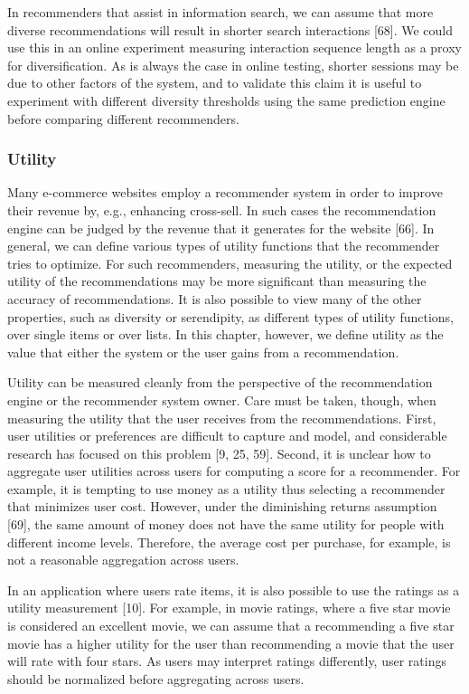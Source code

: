 In recommenders that assist in information search, we can assume that more diverse recommendations will result in shorter search interactions [68]. We could use this in an online experiment measuring interaction sequence length as a proxy for diversification. As is always the case in online testing, shorter sessions may be due to other factors of the system, and to validate this claim it is useful to experiment with different diversity thresholds using the same prediction engine before comparing different recommenders.

\subsubsection{Utility}

Many e-commerce websites employ a recommender system in order to improve their revenue by, e.g., enhancing cross-sell. In such cases the recommendation engine can be judged by the revenue that it generates for the website [66]. In general, we can define various types of utility functions that the recommender tries to optimize. For such recommenders, measuring the utility, or the expected utility of the recommendations may be more significant than measuring the accuracy of recommendations. It is also possible to view many of the other properties, such as diversity or serendipity, as different types of utility functions, over single items or over lists. In this chapter, however, we define utility as the value that either the system or the user gains from a recommendation.

Utility can be measured cleanly from the perspective of the recommendation engine or the recommender system owner. Care must be taken, though, when measuring the utility that the user receives from the recommendations. First, user utilities or preferences are difficult to capture and model, and considerable research has focused on this problem [9, 25, 59]. Second, it is unclear how to aggregate user utilities across users for computing a score for a recommender. For example, it is tempting to use money as a utility thus selecting a recommender that minimizes user cost. However, under the diminishing returns assumption [69], the same amount of money does not have the same utility for people with different income levels. Therefore, the average cost per purchase, for example, is not a reasonable aggregation across users.

In an application where users rate items, it is also possible to use the ratings as a utility measurement [10]. For example, in movie ratings, where a five star movie is considered an excellent movie, we can assume that a recommending a five star movie has a higher utility for the user than recommending a movie that the user will rate with four stars. As users may interpret ratings differently, user ratings should be normalized before aggregating across users.

